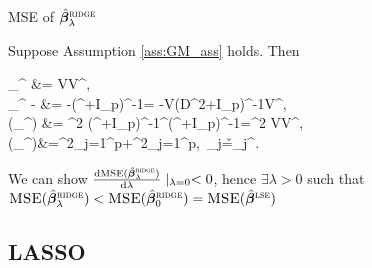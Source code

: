 \documentclass[10pt,a4paper]{book}
\begin{document}
\begin{thmbox}{MSE of $\hat{{\boldsymbol\beta}}_{\lambda}^{\textsc{ridge}}$}
	\begin{proposition}\label{prop:ridge_sol_MSE}
		Suppose Assumption \ref{ass:GM_ass} holds. Then 
		\begin{salign*}
			\bbE \hat{\bab}_{\lambda}^{\ridge} &= V\diag{}V^\TT \bab,\\
			\bbE \hat{\bab}_{\lambda}^{\ridge} - \bab &= -\lambda(\X^\TT\X+\lambda I_p)^{-1}\bab = -\lambda V(D^2+\lambda I_p)^{-1}V^\TT\bab, \\
			\Var(\hat{\bab}_{\lambda}^{\ridge}) &= \sigma^2 (\X^\TT\X +\lambda I_p)^{-1}\X^\TT\X(\X^\TT\X+\lambda I_p)^{-1}=\sigma^2 V\diag{}V^\TT,\\
			\MSE(\hat{\bab}_{\lambda}^{\ridge})&=\lambda^2\sum_{j=1}^{p}+\sigma^2\sum_{j=1}^{p},\ \gamma_j=\v_j^\TT\bab.
		\end{salign*}
		We can show $\frac{\mathrm{d}\textsc{MSE}(\hat{{\boldsymbol\beta}}_{\lambda}^{\textsc{ridge}})}{\mathrm{d}\lambda}\mid_{\lambda=0}<0$, hence $\exists \lambda>0$ such that $\textsc{MSE}(\hat{{\boldsymbol\beta}}_{\lambda}^{\textsc{ridge}}) < \textsc{MSE}(\hat{{\boldsymbol\beta}}_{0}^{\textsc{ridge}}) = \textsc{MSE}(\hat{{\boldsymbol\beta}}^{\textsc{lse}})$   
	\end{proposition}
\end{thmbox}



\subsection{LASSO}\label{sec:lasso}
\end{document}
